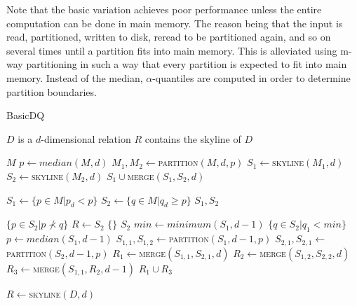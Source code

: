 \documentclass[12pt,a4paper,twoside]{report}
\begin{document}
Note that the basic variation achieves poor performance unless the
entire computation can be done in main memory. The reason being that
the input is read, partitioned, written to disk, reread to be
partitioned again, and so on several times until a partition fits into
main memory. This is alleviated using m-way partitioning in such a way
that every partition is expected to fit into main memory. Instead of
the median, $\alpha$-quantiles are computed in order to determine
partition boundaries.

\begin{algorithm}[H]
	\caption{BasicDQ}
	\label{alg:basicdq}
	\begin{algorithmic}
		\Require $D$ is a $d$-dimensional relation
		\Ensure $R$ contains the skyline of $D$

				\State \Return $M$
			\EndIf
			\State $p \leftarrow median(M,d)$
			\State $M_1, M_2 \leftarrow $\textsc{partition}$(M,d,p)$
			\State $S_1 \leftarrow $\textsc{skyline}$(M_1,d)$
			\State $S_2 \leftarrow $\textsc{skyline}$(M_2,d)$
			\State \Return $S_1 \cup $\textsc{merge}$(S_1,S_2,d)$
		\EndFunction

			\State $S_1 \leftarrow \{p \in M | p_d < p\}$
			\State $S_2 \leftarrow \{q \in M | q_d \geq p\}$
			\State \Return $S_1, S_2$
		\EndFunction

				\State \Return $\{p \in S_2 | p \nprec q\}$
				\State $R \leftarrow S_2$
						\State \Return $\{\}$
					\EndIf
				\EndFor
				\State \Return $S_2$
				\State $min \leftarrow minimum(S_1,d-1)$
				\State \Return $\{q \in S_2 | q_1 < min\}$
			\Else
				\State $p \leftarrow median(S_1,d-1)$
				\State $S_{1,1},S_{1,2} \leftarrow $\textsc{partition}$(S_1,d-1,p)$
				\State $S_{2,1},S_{2,1} \leftarrow $\textsc{partition}$(S_2,d-1,p)$
				\State $R_1 \leftarrow $\textsc{merge}$(S_{1,1},S_{2,1},d)$
				\State $R_2 \leftarrow $\textsc{merge}$(S_{1,2},S_{2,2},d)$
				\State $R_3 \leftarrow $\textsc{merge}$(S_{1,1},R_2,d-1)$
				\State \Return $R_1 \cup R_3$
			\EndIf
		\EndFunction

		\State $R \leftarrow $\textsc{skyline}$(D,d)$
	\end{algorithmic}
\end{algorithm}
\end{document}
